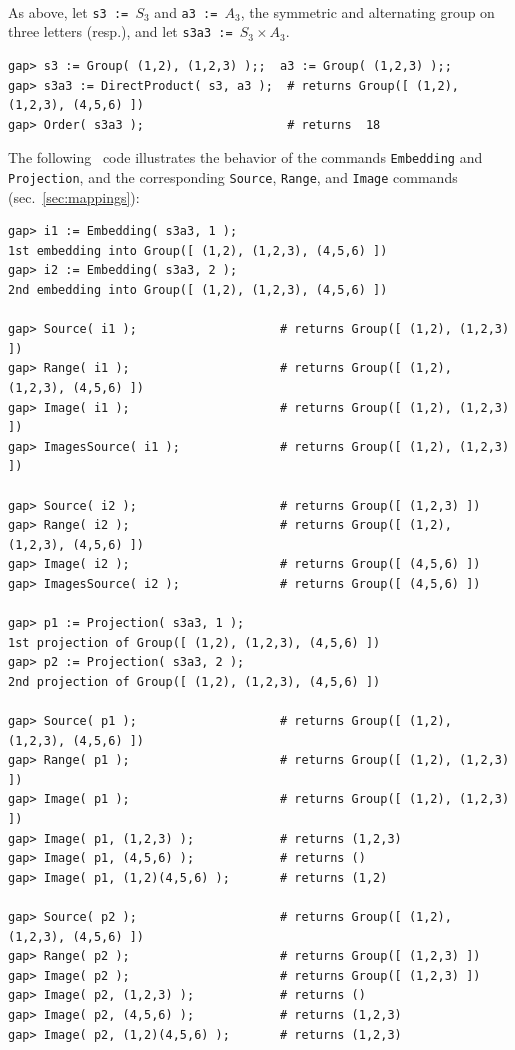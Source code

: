 \\[6pt]
As above, let 
{\tt s3 := $S_3$} and {\tt a3 := $A_3$}, 
the symmetric and alternating group on three letters (resp.), and let 
{\tt s3a3 := $S_3\times A_3$}.
{\codesize
\begin{verbatim}
gap> s3 := Group( (1,2), (1,2,3) );;  a3 := Group( (1,2,3) );;
gap> s3a3 := DirectProduct( s3, a3 );  # returns Group([ (1,2), (1,2,3), (4,5,6) ])
gap> Order( s3a3 );                    # returns  18

\end{verbatim}}
\noindent The following \gap\ code illustrates the behavior of the commands 
{\tt Embedding} and {\tt Projection}, and the corresponding {\tt Source}, 
{\tt Range}, and {\tt Image} commands (sec.~\ref{sec:mappings}): 
{\codesize
\begin{verbatim}
gap> i1 := Embedding( s3a3, 1 );
1st embedding into Group([ (1,2), (1,2,3), (4,5,6) ])
gap> i2 := Embedding( s3a3, 2 );
2nd embedding into Group([ (1,2), (1,2,3), (4,5,6) ])

gap> Source( i1 );                    # returns Group([ (1,2), (1,2,3) ])
gap> Range( i1 );                     # returns Group([ (1,2), (1,2,3), (4,5,6) ])
gap> Image( i1 );                     # returns Group([ (1,2), (1,2,3) ])
gap> ImagesSource( i1 );              # returns Group([ (1,2), (1,2,3) ])

gap> Source( i2 );                    # returns Group([ (1,2,3) ])
gap> Range( i2 );                     # returns Group([ (1,2), (1,2,3), (4,5,6) ])
gap> Image( i2 );                     # returns Group([ (4,5,6) ])
gap> ImagesSource( i2 );              # returns Group([ (4,5,6) ])

gap> p1 := Projection( s3a3, 1 );
1st projection of Group([ (1,2), (1,2,3), (4,5,6) ])
gap> p2 := Projection( s3a3, 2 );
2nd projection of Group([ (1,2), (1,2,3), (4,5,6) ])

gap> Source( p1 );                    # returns Group([ (1,2), (1,2,3), (4,5,6) ])
gap> Range( p1 );                     # returns Group([ (1,2), (1,2,3) ])
gap> Image( p1 );                     # returns Group([ (1,2), (1,2,3) ])
gap> Image( p1, (1,2,3) );            # returns (1,2,3)
gap> Image( p1, (4,5,6) );            # returns ()
gap> Image( p1, (1,2)(4,5,6) );       # returns (1,2)

gap> Source( p2 );                    # returns Group([ (1,2), (1,2,3), (4,5,6) ])
gap> Range( p2 );                     # returns Group([ (1,2,3) ])
gap> Image( p2 );                     # returns Group([ (1,2,3) ])
gap> Image( p2, (1,2,3) );            # returns ()
gap> Image( p2, (4,5,6) );            # returns (1,2,3)
gap> Image( p2, (1,2)(4,5,6) );       # returns (1,2,3)


\end{verbatim}}
